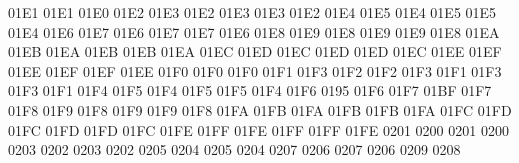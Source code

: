 \setcclcucx 01E1 01E1 01E0 %
\setcclcucx 01E2 01E3 01E2 %
\setcclcucx 01E3 01E3 01E2 %
\setcclcucx 01E4 01E5 01E4 %
\setcclcucx 01E5 01E5 01E4 %
\setcclcucx 01E6 01E7 01E6 %
\setcclcucx 01E7 01E7 01E6 %
\setcclcucx 01E8 01E9 01E8 %
\setcclcucx 01E9 01E9 01E8 %
\setcclcucx 01EA 01EB 01EA %
\setcclcucx 01EB 01EB 01EA %
\setcclcucx 01EC 01ED 01EC %
\setcclcucx 01ED 01ED 01EC %
\setcclcucx 01EE 01EF 01EE %
\setcclcucx 01EF 01EF 01EE %
\setcclcucx 01F0 01F0 01F0 %
\setcclcucx 01F1 01F3 01F2 %
\setcclcucx 01F2 01F3 01F1 %
\setcclcucx 01F3 01F3 01F1 %
\setcclcucx 01F4 01F5 01F4 %
\setcclcucx 01F5 01F5 01F4 %
\setcclcucx 01F6 0195 01F6 %
\setcclcucx 01F7 01BF 01F7 %
\setcclcucx 01F8 01F9 01F8 %
\setcclcucx 01F9 01F9 01F8 %
\setcclcucx 01FA 01FB 01FA %
\setcclcucx 01FB 01FB 01FA %
\setcclcucx 01FC 01FD 01FC %
\setcclcucx 01FD 01FD 01FC %
\setcclcucx 01FE 01FF 01FE %
\setcclcucx 01FF 01FF 01FE %
 0201 0200 %
 0201 0200 %
 0203 0202 %
 0203 0202 %
 0205 0204 %
 0205 0204 %
 0207 0206 %
 0207 0206 %
 0209 0208 %

